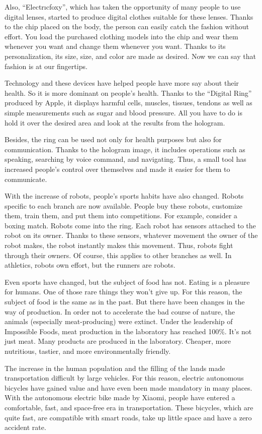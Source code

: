 \documentclass[]{book}
\begin{document}
Also, ``Electrıcfoxy'', which has taken the opportunity of many people to use digital lenses, started to produce digital clothes suitable for these lenses. Thanks to the chip placed on the body, the person can easily catch the fashion without effort. You load the purchased clothing models into the chip and wear them whenever you want and change them whenever you want. Thanks to its personalization, its size, size, and color are made as desired. Now we can say that fashion is at our fingertips.

Technology and these devices have helped people have more say about their health. So it is more dominant on people's health. Thanks to the ``Digital Ring'' produced by Apple, it displays harmful cells, muscles, tissues, tendons as well as simple measurements such as sugar and blood pressure. All you have to do is hold it over the desired area and look at the results from the hologram.

Besides, the ring can be used not only for health purposes but also for communication. Thanks to the hologram image, it includes operations such as speaking, searching by voice command, and navigating. Thus, a small tool has increased people's control over themselves and made it easier for them to communicate.

With the increase of robots, people's sports habits have also changed. Robots specific to each branch are now available. People buy these robots, customize them, train them, and put them into competitions. For example, consider a boxing match. Robots come into the ring. Each robot has sensors attached to the robot on its owner. Thanks to these sensors, whatever movement the owner of the robot makes, the robot instantly makes this movement. Thus, robots fight through their owners. Of course, this applies to other branches as well. In athletics, robots own effort, but the runners are robots.

Even sports have changed, but the subject of food has not. Eating is a pleasure for humans. One of those rare things they won't give up. For this reason, the subject of food is the same as in the past. But there have been changes in the way of production. In order not to accelerate the bad course of nature, the animals (especially meat-producing) were extinct. Under the leadership of Impossible Foods, meat production in the laboratory has reached 100\%. It's not just meat. Many products are produced in the laboratory. Cheaper, more nutritious, tastier, and more environmentally friendly.

The increase in the human population and the filling of the lands made transportation difficult by large vehicles. For this reason, electric autonomous bicycles have gained value and have even been made mandatory in many places. With the autonomous electric bike made by Xiaomi, people have entered a comfortable, fast, and space-free era in transportation. These bicycles, which are quite fast, are compatible with smart roads, take up little space and have a zero accident rate.
\end{document}
